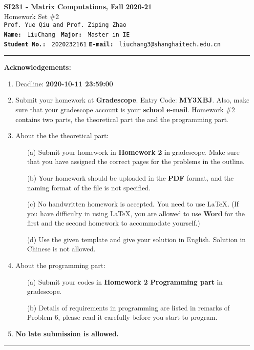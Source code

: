 \documentclass[english,onecolumn]{IEEEtran}
\begin{document}
\begin{center}
	\textbf{{\Large SI231 - Matrix Computations, Fall 2020-21}}\\
	Homework Set \#2\\
   \texttt{Prof. Yue Qiu and Prof. Ziping Zhao} \\
	\texttt{\textbf{Name:}}   	\texttt{ LiuChang }  		\hspace{1bp}
	\texttt{\textbf{Major:}}  	\texttt{ Master in IE } 	\\
	\texttt{\textbf{Student No.:}} 	\texttt{ 2020232161}     \hspace{1bp}
	\texttt{\textbf{E-mail:}} 	\texttt{ liuchang3@shanghaitech.edu.cn}
\par\end{center}

\noindent
\rule{\linewidth}{0.4pt}
{\bf {\large Acknowledgements:}}
\begin{enumerate}
    \item Deadline: \textbf{2020-10-11 23:59:00}
    \item Submit your homework at \textbf{Gradescope}. Entry Code: \textbf{MY3XBJ}. Also, make sure that your gradescope account is your \textbf{school e-mail}.
    Homework \#2 contains two parts, the theoretical part the and the programming part.
    \item About the the theoretical part:
    \begin{enumerate}
            \item[(a)] Submit your homework in \textbf{Homework 2} in gradescope. Make sure that you have assigned the correct pages for the problems in the outline.
            \item[(b)] Your homework should be uploaded in the \textbf{PDF} format, and the naming format of the file is not specified.
            \item[(c)] No handwritten homework is accepted. You need to use \LaTeX. (If you have difficulty in using \LaTeX, you are allowed to use \textbf{Word} for the first and the second homework to accommodate yourself.)
            \item[(d)] Use the given template and give your solution in English. Solution in Chinese is not allowed. 
        \end{enumerate}
  \item About the programming part:
  \begin{enumerate}
      \item[(a)] Submit your codes in \textbf{Homework 2 Programming part} in gradescope.
      \item[(b)] Details of requirements in programming are listed in remarks of Problem 6, please read it carefully before you start to program.
  \end{enumerate}
  \item \textbf{No late submission is allowed.}
\end{enumerate}
\rule{\linewidth}{0.4pt}
\end{document}
